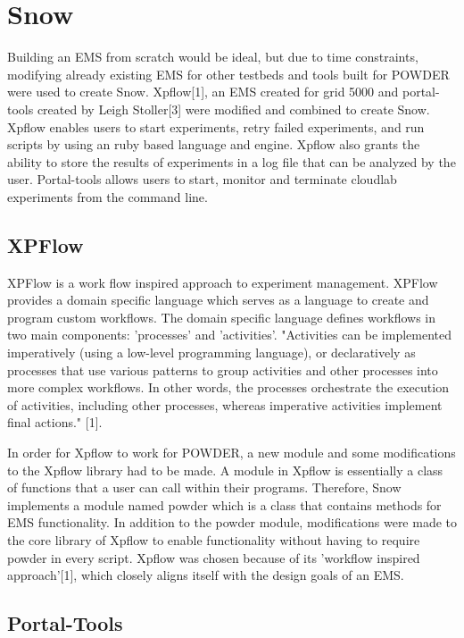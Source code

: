 \documentclass[11pt,twocolumn,letterpaper]{article}
\begin{document}
\section{Snow}

Building an EMS from scratch would be ideal, but due to time constraints, modifying already existing EMS for other testbeds and tools built for POWDER were used to create  Snow.  Xpflow[1], an EMS created for grid 5000 and portal-tools created by Leigh Stoller[3] were modified and combined to create Snow.  Xpflow enables users to start experiments, retry failed experiments, and run scripts by using an ruby based language and engine.  Xpflow also grants the ability to store the results of experiments in a log file that can be analyzed by the user.  Portal-tools allows users to start, monitor and terminate cloudlab experiments from the command line.

\subsection{XPFlow}

XPFlow is a work flow inspired approach to experiment management.  XPFlow provides a domain specific language which serves as a language to create and program custom workflows.  The domain specific language defines workflows in two main components: 'processes' and 'activities'.  "Activities can be implemented imperatively (using a low-level programming language), or declaratively as processes that use various patterns to group activities and other processes into more complex workflows. In other words, the processes orchestrate the execution of activities, including other processes, whereas imperative activities implement final actions." [1].

In order for Xpflow to work for POWDER, a new module and some modifications to the Xpflow library had to be made. A module in Xpflow is essentially a class of functions that a user can call within their programs.  Therefore, Snow implements a module named powder which is a class that contains methods for EMS functionality. In addition to the powder module, modifications were made to the core library of Xpflow to enable functionality without having to require powder in every script. Xpflow was chosen because of its 'workflow inspired approach'[1], which closely aligns itself with the design goals of an EMS.

\subsection{Portal-Tools}
\end{document}
